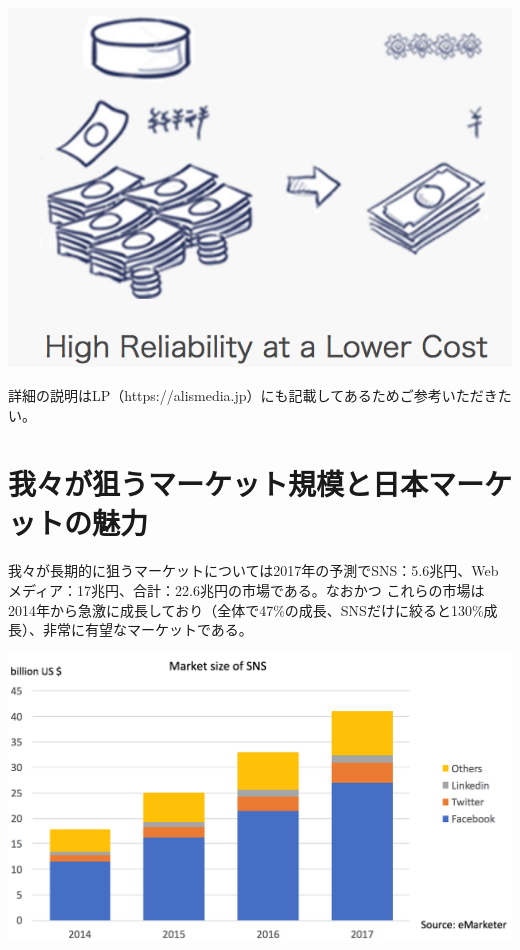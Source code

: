 \documentclass{jsarticle}
\begin{document}
\begin{center}
	\includegraphics[scale=0.4]{img/highreliablility.png}
\end{center}

詳細の説明はLP（https://alismedia.jp）にも記載してあるためご参考いただきたい。

\section{我々が狙うマーケット規模と日本マーケットの魅力}
我々が長期的に狙うマーケットについては2017年の予測でSNS：5.6兆円、Webメディア：17兆円、合計：22.6兆円の市場である。なおかつ
これらの市場は2014年から急激に成長しており（全体で47\%の成長、SNSだけに絞ると130\%成長）、非常に有望なマーケットである。

\begin{center}
	\includegraphics[scale=0.4]{img/sns-marketsize.png}
\end{center}
\end{document}
